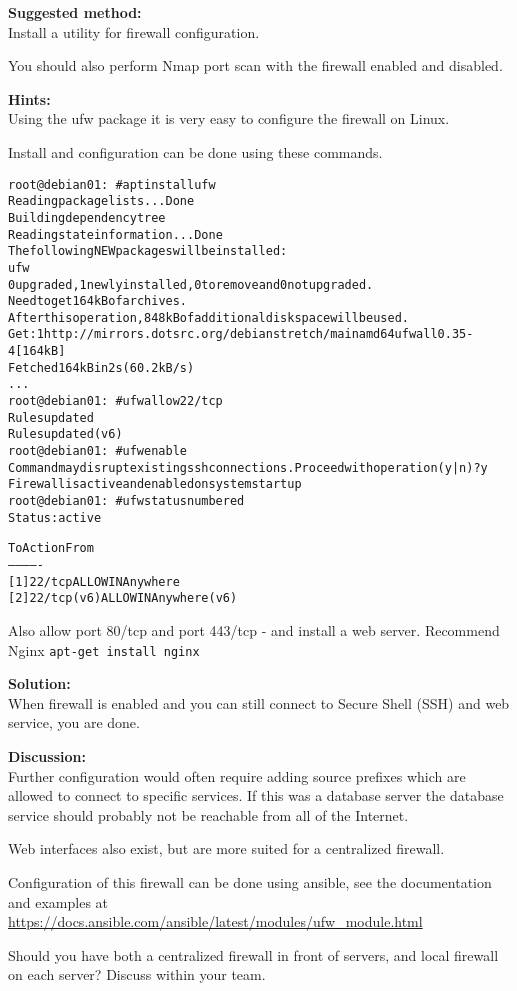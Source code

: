 \documentclass[a4paper,11pt,notitlepage]{report}
\begin{document}
{\bf Suggested method:}\\
Install a utility for firewall configuration.

You should also perform Nmap port scan with the firewall enabled and disabled.

{\bf Hints:}\\
Using the ufw package it is very easy to configure the firewall on Linux.

Install and configuration can be done using these commands.
\begin{alltt}
root@debian01:~# apt install ufw
Reading package lists... Done
Building dependency tree
Reading state information... Done
The following NEW packages will be installed:
  ufw
0 upgraded, 1 newly installed, 0 to remove and 0 not upgraded.
Need to get 164 kB of archives.
After this operation, 848 kB of additional disk space will be used.
Get:1 http://mirrors.dotsrc.org/debian stretch/main amd64 ufw all 0.35-4 [164 kB]
Fetched 164 kB in 2s (60.2 kB/s)
...
root@debian01:~# ufw allow 22/tcp
Rules updated
Rules updated (v6)
root@debian01:~# ufw enable
Command may disrupt existing ssh connections. Proceed with operation (y|n)? y
Firewall is active and enabled on system startup
root@debian01:~# ufw status numbered
Status: active

     To                         Action      From
     --                         ------      ----
[ 1] 22/tcp                     ALLOW IN    Anywhere
[ 2] 22/tcp (v6)                ALLOW IN    Anywhere (v6)
\end{alltt}

Also allow port 80/tcp and port 443/tcp - and install a web server. Recommend Nginx \verb+apt-get install nginx+

{\bf Solution:}\\
When firewall is enabled and you can still connect to Secure Shell (SSH) and web service, you are done.

{\bf Discussion:}\\
Further configuration would often require adding source prefixes which are allowed to connect to specific services. If this was a database server the database service should probably not be reachable from all of the Internet.

Web interfaces also exist, but are more suited for a centralized firewall.

Configuration of this firewall can be done using ansible, see the documentation and examples at \url{https://docs.ansible.com/ansible/latest/modules/ufw_module.html}

Should you have both a centralized firewall in front of servers, and local firewall on each server? Discuss within your team.
\end{document}
